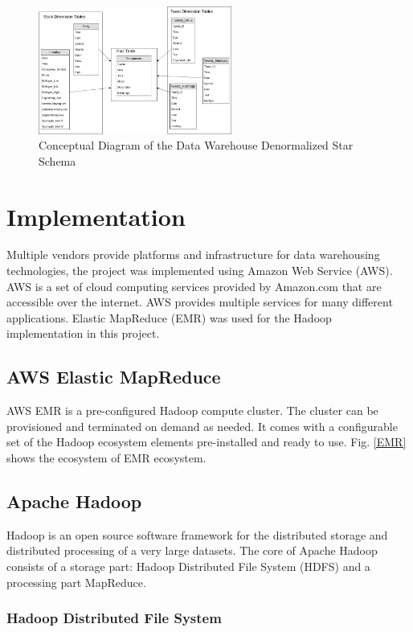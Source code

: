 \documentclass[journal]{IEEEtran}
\begin{document}
\begin{figure}
    \centering
    \includegraphics[width=2.5in]{Star_Conceptual_Schema.png}
    \caption{Conceptual Diagram of the Data Warehouse 
        Denormalized Star Schema}
    \label{star}
\end{figure}

\section{Implementation}

Multiple vendors provide platforms and infrastructure for data warehousing technologies, the project was implemented using Amazon Web Service (AWS).
AWS is a set of cloud computing services provided by Amazon.com that are accessible over the internet.
AWS provides multiple services for many different applications. 
Elastic MapReduce (EMR) was used for the Hadoop implementation in this project.

\subsection{AWS Elastic MapReduce}

AWS EMR is a pre-configured Hadoop compute cluster.
The cluster can be provisioned and terminated on demand as needed.
It comes with a configurable set of the Hadoop ecosystem elements pre-installed and ready to use.
Fig. \ref{EMR} shows the ecosystem of EMR ecosystem.

\subsection{Apache Hadoop}

Hadoop is an open source software framework for the distributed storage and
 distributed processing of a very large datasets. 
The core of Apache Hadoop consists of a storage part: Hadoop Distributed File System
 (HDFS) and a processing part MapReduce.

\subsubsection{Hadoop Distributed File System}
\end{document}

